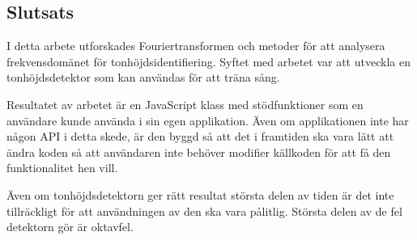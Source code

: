 \subsection*{Slutsats}
I detta arbete utforskades Fouriertransformen och metoder för att analysera frekvensdomänet för tonhöjdsidentifiering. Syftet med arbetet var att utveckla en tonhöjdsdetektor som kan användas för att träna sång.

Resultatet av arbetet är en JavaScript klass med stödfunktioner som en användare kunde använda i sin egen applikation. Även om applikationen inte har någon API i detta skede, är den byggd så att det i framtiden ska vara lätt att ändra koden så att användaren inte behöver modifier källkoden för att få den funktionalitet hen vill. 

Även om tonhöjdsdetektorn ger rätt resultat största delen av tiden är det inte tillräckligt för att användningen av den ska vara pålitlig. Största delen av de fel detektorn gör är oktavfel.
